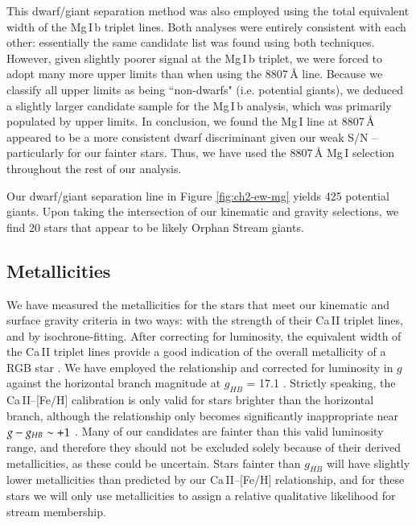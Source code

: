 This dwarf/giant separation method was also employed using the total equivalent width of the Mg\,\textsc{I}\,b triplet lines. Both analyses were entirely consistent with each other: essentially the same candidate list was found using both techniques. However, given slightly poorer signal at the Mg\,\textsc{I}\,b triplet, we were forced to adopt many more upper limits than when using the 8807\,{\AA} line. Because we classify all upper limits as being ``non-dwarfs" (i.e. potential giants), we deduced a slightly larger candidate sample for the Mg\,\textsc{I}\,b analysis, which was primarily populated by upper limits. In conclusion, we found the Mg\,\textsc{I} line at 8807\,{\AA} appeared to be a more consistent dwarf discriminant given our weak S/N \--- particularly for our fainter stars. Thus, we have used the 8807\,{\AA} Mg\,\textsc{I} selection throughout the rest of our analysis.

Our dwarf/giant separation line in Figure \ref{fig:ch2-ew-mg} yields 425 potential giants. Upon taking the intersection of our kinematic and gravity selections, we find 20 stars that appear to be likely Orphan Stream giants.


\subsection{Metallicities}
\label{sec:ch2-metallicities}

We have measured the metallicities for the stars that meet our kinematic and surface gravity criteria in two ways: with the strength of their Ca\,\textsc{II} triplet lines, and by isochrone-fitting. After correcting for luminosity, the equivalent width of the Ca\,\textsc{II} triplet lines provide a good indication of the overall metallicity of a RGB star \citep{Amandroff_Da_Costa_1991}. We have employed the \citet{Starkenburg_et-al_2010} relationship and corrected for luminosity in $g$ against the horizontal branch magnitude at $g_{HB}$ = 17.1 \citep{Newberg_et-al_2010}. Strictly speaking, the Ca\,\textsc{II}\---[Fe/H] calibration is only valid for stars brighter than the horizontal branch, although the relationship only becomes significantly inappropriate near $g \-- g_{HB} \sim +1$ \citep{Saviane_et-al_2012}. Many of our candidates are fainter than this valid luminosity range, and therefore they should not be excluded solely because of their derived metallicities, as these could be uncertain. Stars fainter than $g_{HB}$ will have slightly lower metallicities than predicted by our Ca\,\textsc{II}\---[Fe/H] relationship, and for these stars we will only use metallicities to assign a relative qualitative likelihood for stream membership.

